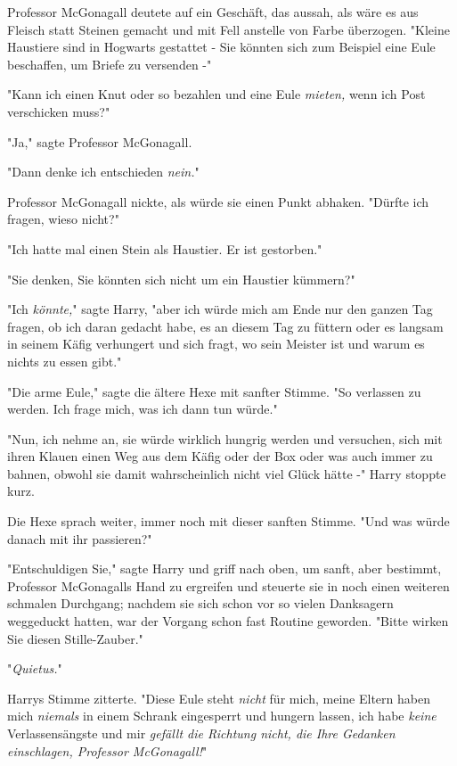{Professor McGonagall deutete auf ein Geschäft, das aussah, als wäre es aus Fleisch statt Steinen gemacht und mit Fell anstelle von Farbe überzogen. "Kleine Haustiere sind in Hogwarts gestattet - Sie könnten sich zum Beispiel eine Eule beschaffen, um Briefe zu versenden -"

"Kann ich einen Knut oder so bezahlen und eine Eule \emph{mieten,} wenn ich Post verschicken muss?"

"Ja," sagte Professor McGonagall.

"Dann denke ich entschieden \emph{nein.}"

Professor McGonagall nickte, als würde sie einen Punkt abhaken. "Dürfte ich fragen, wieso nicht?"

"Ich hatte mal einen Stein als Haustier. Er ist gestorben."

"Sie denken, Sie könnten sich nicht um ein Haustier kümmern?"

"Ich \emph{könnte,}" sagte Harry, "aber ich würde mich am Ende nur den ganzen Tag fragen, ob ich daran gedacht habe, es an diesem Tag zu füttern oder es langsam in seinem Käfig verhungert und sich fragt, wo sein Meister ist und warum es nichts zu essen gibt."

"Die arme Eule," sagte die ältere Hexe mit sanfter Stimme. "So verlassen zu werden. Ich frage mich, was ich dann tun würde."

"Nun, ich nehme an, sie würde wirklich hungrig werden und versuchen, sich mit ihren Klauen einen Weg aus dem Käfig oder der Box oder was auch immer zu bahnen, obwohl sie damit wahrscheinlich nicht viel Glück hätte -" Harry stoppte kurz.

Die Hexe sprach weiter, immer noch mit dieser sanften Stimme. "Und was würde danach mit ihr passieren?"

"Entschuldigen Sie," sagte Harry und griff nach oben, um sanft, aber bestimmt, Professor McGonagalls Hand zu ergreifen und steuerte sie in noch einen weiteren schmalen Durchgang; nachdem sie sich schon vor so vielen Danksagern weggeduckt hatten, war der Vorgang schon fast Routine geworden. "Bitte wirken Sie diesen Stille-Zauber."

"\emph{Quietus.}"

Harrys Stimme zitterte. "Diese Eule steht \emph{nicht} für mich, meine Eltern haben mich \emph{niemals} in einem Schrank eingesperrt und hungern lassen, ich habe \emph{keine} Verlassensängste und mir \emph{gefällt die Richtung nicht, die Ihre Gedanken einschlagen, Professor McGonagall!}"

}
